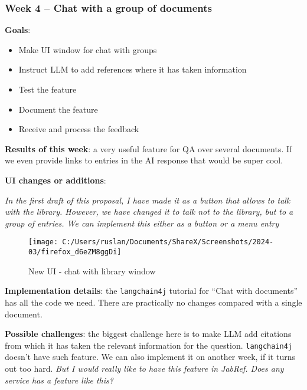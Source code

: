 \documentclass{article}
\begin{document}
	\subsubsection{Week 4 -- Chat with a group of documents}
	\textbf{Goals}:
	\begin{itemize}
		\item Make UI window for chat with groups
		\item Instruct LLM to add references where it has taken information
		\item Test the feature
		\item Document the feature
		\item Receive and process the feedback
	\end{itemize}
	
	\textbf{Results of this week}: a very useful feature for QA over several documents. If we even provide links to entries in the AI response that would be super cool.
	
	\textbf{UI changes or additions}:
	
	\textit{In the first draft of this proposal, I have made it as a button that allows to talk with the library. However, we have changed it to talk not to the library, but to a group of entries. We can implement this either as a button or a menu entry}
	
	\begin{figure}[H]
		\centering
		\texttt{[image: C:/Users/ruslan/Documents/ShareX/Screenshots/2024-03/firefox\_d6eZM8ggDi]}
		\caption{New UI - chat with library window}
		\label{fig:firefoxd6ezm8ggdi}
	\end{figure}
	
	\textbf{Implementation details}: the \texttt{langchain4j} tutorial for \enquote{Chat with documents} has all the code we need. There are practically no changes compared with a single document.
	
	\textbf{Possible challenges}: the biggest challenge here is to make LLM add citations from which it has taken the relevant information for the question. \texttt{langchain4j} doesn't have such feature. We can also implement it on another week, if it turns out too hard. \textit{But I would really like to have this feature in JabRef. Does any service has a feature like this?}
	
%	
%			
%			
%	
	
\end{document}
